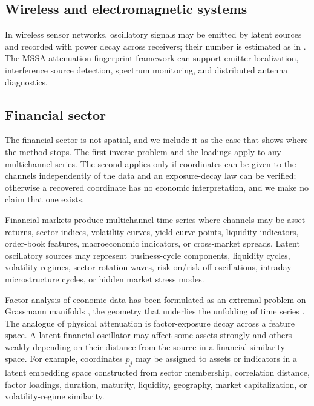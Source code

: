 \documentclass{article}
\begin{document}
\subsection{Wireless and electromagnetic systems}\label{sec:wireless-and-electromagnetic-systems}

In wireless sensor networks, oscillatory signals may be emitted by latent sources and recorded with power decay across receivers; their number is estimated as in \cite{ref-BernadotteBuchstaber}. The MSSA attenuation-fingerprint framework can support emitter localization, interference source detection, spectrum monitoring, and distributed antenna diagnostics.

\subsection{Financial sector}\label{sec:financial-sector}

The financial sector is not spatial, and we include it as the case that shows where the method stops. The first inverse problem and the loadings apply to any multichannel series. The second applies only if coordinates can be given to the channels independently of the data and an exposure-decay law can be verified; otherwise a recovered coordinate has no economic interpretation, and we make no claim that one exists.

Financial markets produce multichannel time series where channels may be asset returns, sector indices, volatility curves, yield-curve points, liquidity indicators, order-book features, macroeconomic indicators, or cross-market spreads. Latent oscillatory sources may represent business-cycle components, liquidity cycles, volatility regimes, sector rotation waves, risk-on/risk-off oscillations, intraday microstructure cycles, or hidden market stress modes.

Factor analysis of economic data has been formulated as an extremal problem on Grassmann manifolds \cite{ref-BuchstaberMaslov}, the geometry that underlies the unfolding of time series \cite{ref-Buchstaber}. The analogue of physical attenuation is factor-exposure decay across a feature space. A latent financial oscillator may affect some assets strongly and others weakly depending on their distance from the source in a financial similarity space. For example, coordinates $p_j$ may be assigned to assets or indicators in a latent embedding space constructed from sector membership, correlation distance, factor loadings, duration, maturity, liquidity, geography, market capitalization, or volatility-regime similarity.
\end{document}
